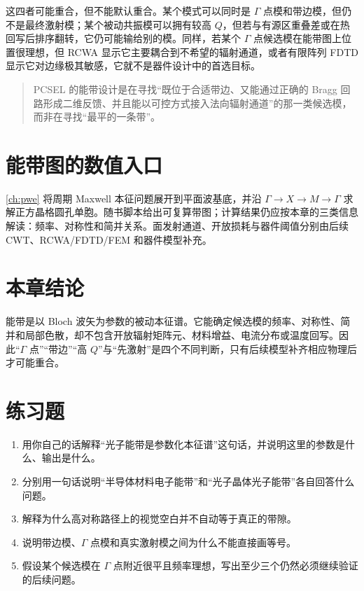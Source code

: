 这四者可能重合，但不能默认重合。某个模式可以同时是 $\Gamma$ 点模和带边模，但仍不是最终激射模；某个被动共振模可以拥有较高 $Q$，但若与有源区重叠差或在热回写后排序翻转，它仍可能输给别的模。同样，若某个 $\Gamma$ 点候选模在能带图上位置很理想，但 RCWA 显示它主要耦合到不希望的辐射通道，或者有限阵列 FDTD 显示它对边缘极其敏感，它就不是器件设计中的首选目标。

\begin{quote}
PCSEL 的能带设计是在寻找“既位于合适带边、又能通过正确的 Bragg 回路形成二维反馈、并且能以可控方式接入法向辐射通道”的那一类候选模，而非在寻找“最平的一条带”。
\end{quote}

\section{能带图的数值入口}
\cref{ch:pwe} 将周期 Maxwell 本征问题展开到平面波基底，并沿 $\Gamma\rightarrow X\rightarrow M\rightarrow\Gamma$ 求解正方晶格圆孔单胞。随书脚本给出可复算带图；计算结果仍应按本章的三类信息解读：频率、对称性和简并关系。面发射通道、开放损耗与器件阈值分别由后续 CWT、RCWA/FDTD/FEM 和器件模型补充。

\section*{本章结论}
能带是以 Bloch 波矢为参数的被动本征谱。它能确定候选模的频率、对称性、简并和局部色散，却不包含开放辐射矩阵元、材料增益、电流分布或温度回写。因此“$\Gamma$ 点”“带边”“高 $Q$”与“先激射”是四个不同判断，只有后续模型补齐相应物理后才可能重合。

\section*{练习题}
\begin{enumerate}
  \item \basicq 用你自己的话解释“光子能带是参数化本征谱”这句话，并说明这里的参数是什么、输出是什么。

  \item \basicq 分别用一句话说明“半导体材料电子能带”和“光子晶体光子能带”各自回答什么问题。

  \item \basicq 解释为什么高对称路径上的视觉空白并不自动等于真正的带隙。

  \item \midq 说明带边模、$\Gamma$ 点模和真实激射模之间为什么不能直接画等号。

  \item \hardq 假设某个候选模在 $\Gamma$ 点附近很平且频率理想，写出至少三个仍然必须继续验证的后续问题。
\end{enumerate}

